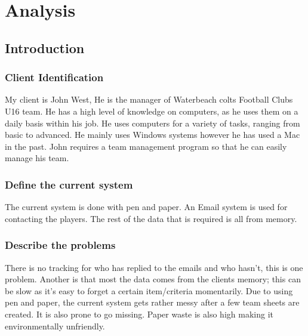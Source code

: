 \chapter{Analysis}

\section{Introduction}

\subsection{Client Identification}
My client is John West, He is the manager of Waterbeach colts Football Clubs U16 team.  He has a high level of knowledge on computers, as he uses them on a daily basis within his job. He uses computers for a variety of tasks, ranging from basic to advanced. He mainly uses Windows systems however he has used a Mac in the past. John requires a team management program so that he can easily manage his team.
\subsection{Define the current system}
The current system is done with pen and paper. An Email system is used for contacting the players. The rest of the data that is required is all from memory.
\subsection{Describe the problems}
There is no tracking for who has replied to the emails and who hasn't, this is one problem.  Another is that most the data comes from the clients memory; this can be slow as it's easy to forget a certain item/criteria momentarily. Due to using pen and paper, the current system gets rather messy after a few team sheets are created. It is also prone to go missing. Paper waste is also high making it environmentally unfriendly.

